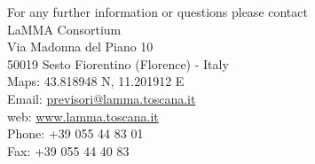 \documentclass[11pt,english]{article}
\begin{document}
\vspace{5.55cm}
\begin{flushright}
\large{For any further information or questions please contact
\\LaMMA Consortium
\\Via Madonna del Piano 10
\\50019 Sesto Fiorentino (Florence) - Italy
\\Maps: 43.818948 N, 11.201912 E
\\Email: \href{mailto:previsori@lamma.toscana.it}{previsori@lamma.toscana.it}
\\web: \href{www.lamma.toscana.it}{www.lamma.toscana.it}
\\Phone: +39 055 44 83 01
\\Fax: +39 055 44 40 83}
\end{flushright}

\end{document}
